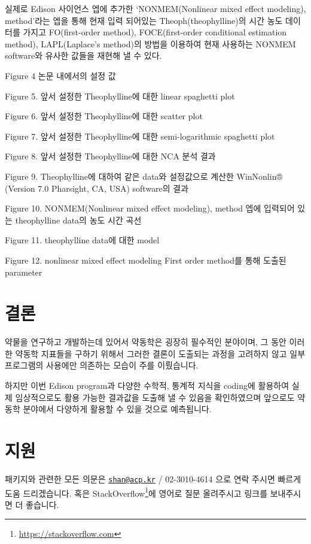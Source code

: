 \documentclass[12pt,]{krantz}
\let\rmarkdownfootnote\footnote%
\def\footnote{\protect\rmarkdownfootnote}
\theoremstyle{definition}
\theoremstyle{definition}
\theoremstyle{definition}
\theoremstyle{remark}
\begin{document}
실제로 Edison 사이언스 엡에 추가한 `NONMEM(Nonlinear mixed effect
modeling), method'라는 엡을 통해 현재 입력 되어있는
Theoph(theophylline)의 시간 농도 데이터를 가지고 FO(first-order method),
FOCE(first-order conditional estimation method), LAPL(Laplace's
method)의 방법을 이용하여 현재 사용하는 NONMEM software와 유사한 값들을
재현해 낼 수 있다.

Figure 4 논문 내에서의 설정 값

Figure 5. 앞서 설정한 Theophylline에 대한 linear spaghetti plot

Figure 6. 앞서 설정한 Theophylline에 대한 scatter plot

Figure 7. 앞서 설정한 Theophylline에 대한 semi-logarithmic spaghetti
plot

Figure 8. 앞서 설정한 Theophylline에 대한 NCA 분석 결과

Figure 9. Theophylline에 대하여 같은 data와 설정값으로 계산한 WinNonlin®
(Version 7.0 Pharsight, CA, USA) software의 결과

Figure 10. NONMEM(Nonlinear mixed effect modeling), method 엡에 입력되어
있는 theophylline data의 농도 시간 곡선

Figure 11. theophylline data에 대한 model

Figure 12. nonlinear mixed effect modeling First order method를 통해
도출된 parameter

\chapter{결론}\label{conclusion}

약물을 연구하고 개발하는데 있어서 약동학은 굉장히 필수적인 분야이며, 그
동안 이러한 약동학 지표들을 구하기 위해서 그러한 결론이 도출되는 과정을
고려하지 않고 일부 프로그램의 사용에만 의존하는 모습이 주를 이뤘습니다.

하지만 이번 Edison program과 다양한 수학적, 통계적 지식을 coding에
활용하여 실제 임상적으로도 활용 가능한 결과값을 도출해 낼 수 있음을
확인하였으며 앞으로도 약동학 분야에서 다양하게 활용할 수 있을 것으로
예측됩니다.

\appendix {}


\chapter{지원}

패키지와 관련한 모든 의문은
\href{mailto:shan@acp.kr}{\nolinkurl{shan@acp.kr}} / 02-3010-4614 으로
연락 주시면 빠르게 도움 드리겠습니다. 혹은 StackOverflow\footnote{\url{https://stackoverflow.com}}에
영어로 질문 올려주시고 링크를 보내주시면 더 좋습니다.
\end{document}
